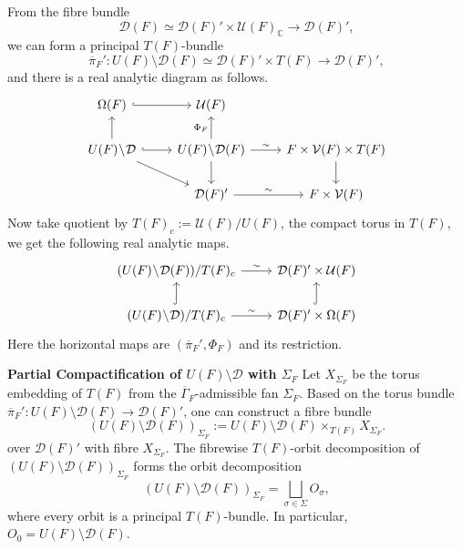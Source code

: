 \documentclass[11pt,english]{smfart}
\theoremstyle{definition}
\theoremstyle{remark}
\renewcommand{\C}{\mathbb{C}}
\newcommand{\under}{\!\setminus\!}
\renewcommand{\bar}{\overline}
\begin{document}
From the fibre bundle \[\mathcal{D}(F)\simeq\mathcal{D}(F)'\times\mathcal{U}(F)_\C\to\mathcal{D}(F)',\]
we can form a principal $T(F)$-bundle \[\bar{\pi}_F': U(F)\under\mathcal{D}(F)\simeq \mathcal{D}(F)'\times T(F)\to\mathcal{D}(F)',\]
and there is a real analytic diagram as follows.
\[%
\begin{tikzcd}
\Omega(F) \arrow[r, hook]                                  & \mathcal{U}(F)                                                           &                                             \\
U(F)\under\mathcal{D} \arrow[u] \arrow[r, hook] \arrow[rd] & U(F)\under\mathcal{D}(F) \arrow[u, "\Phi_F"] \arrow[d] \arrow[r, "\sim"] & F\times \mathcal{V}(F)\times T(F) \arrow[d] \\
                                                     & \mathcal{D}(F)' \arrow[r, "\sim"]                                        & F\times\mathcal{V}(F)                      
\end{tikzcd}\]
Now take quotient by $T(F)_c := \mathcal{U}(F)/U(F)$, the compact torus in $T(F)$, we get the following real analytic maps.
\[
\begin{tikzcd}
(U(F)\under\mathcal{D}(F))/T(F)_c \arrow[r, "\sim"]              & \mathcal{D}(F)'\times\mathcal{U}(F)            \\
(U(F)\under\mathcal{D})/T(F)_c \arrow[r, "\sim"] \arrow[u, hook] & \mathcal{D}(F)'\times\Omega(F) \arrow[u, hook]
\end{tikzcd}\]
Here the horizontal maps are $(\bar{\pi}_F', \Phi_F)$ and its restriction.


\noindent\textbf{Partial Compactification of $U(F)\under\mathcal{D} $ with $\Sigma_F$}
Let $X_{\Sigma_F}$ be the torus embedding of $T(F)$ from the $\bar{\Gamma}_F$-admissible fan $\Sigma_F$.
Based on the torus bundle $\bar{\pi}_F': U(F)\under\mathcal{D}(F)\to\mathcal{D}(F)'$, one can construct a fibre bundle\[(U(F)\under\mathcal{D}(F))_{\Sigma_F} := U(F)\under\mathcal{D}(F) \times_{T(F)} X_{\Sigma_F}.\]
over $\mathcal{D}(F)'$ with fibre $X_{\Sigma_F}$.
The fibrewise $T(F)$-orbit decomposition of $(U(F)\under\mathcal{D}(F))_{\Sigma_F}$ forms the orbit decomposition \[(U(F)\under\mathcal{D}(F))_{\Sigma_F} = \bigsqcup_{\sigma\in\Sigma} O_{\sigma},\]
where every orbit is a principal $T(F)$-bundle. In particular, $O_0 = U(F)\under \mathcal{D}(F)$.
\end{document}
